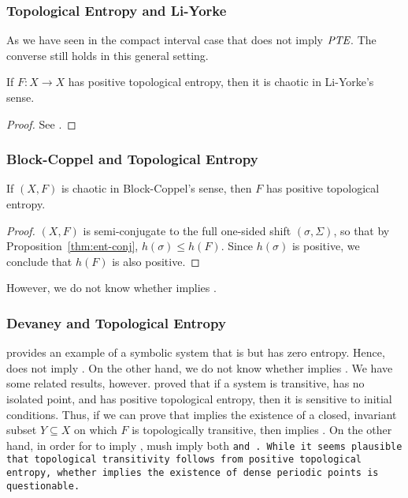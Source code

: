 \documentclass[10pt,twoside,draft]{book}
\begin{document}
\subsubsection*{Topological Entropy and Li-Yorke}
As we have seen in the compact interval case that \liy does not imply $\emph{PTE}$.
The converse still holds in this general setting.
\begin{theorem}
  If $F: X \to X$ has positive topological entropy, then it is chaotic in Li-Yorke's sense.
  \label{thm:ent-liy}
  \begin{proof}
    See \citet{blanchard}.
  \end{proof}
\end{theorem}

\subsubsection*{Block-Coppel and Topological Entropy}
\begin{theorem}
  If $(X,F)$ is chaotic in Block-Coppel's sense, then $F$ has positive topological entropy.
  \begin{proof}
    $(X,F)$ is semi-conjugate to the full one-sided shift $(\sigma, \Sigma)$, so that by Proposition~\ref{thm:ent-conj}, $h(\sigma) \leq h(F)$.
    Since $h(\sigma)$ is positive, we conclude that $h(F)$ is also positive.
  \end{proof}
  \label{thm:blcp-ent}
\end{theorem}
%
However, we do not know whether \pte implies \blcp.



\subsubsection*{Devaney and Topological Entropy}
\citet{glasner} provides an example of a symbolic system that is \dev but has zero entropy.
Hence, \dev does not imply \pte.
On the other hand, we do not know whether \pte implies \dev.
We have some related results, however.
\citet{glasner} proved that if a system is transitive, has no isolated point, and has positive topological entropy, then it is sensitive to initial conditions.
Thus, if we can prove that \pte implies the existence of a closed, invariant subset $Y \subseteq X$ on which $F$ is topologically transitive, then \pte implies \wig.
On the other hand, in order for \pte to imply \dev, \pte mush imply both \tt and \dpp.
While it seems plausible that topological transitivity follows from positive topological entropy, whether \pte implies the existence of dense periodic points is questionable.
\end{document}
